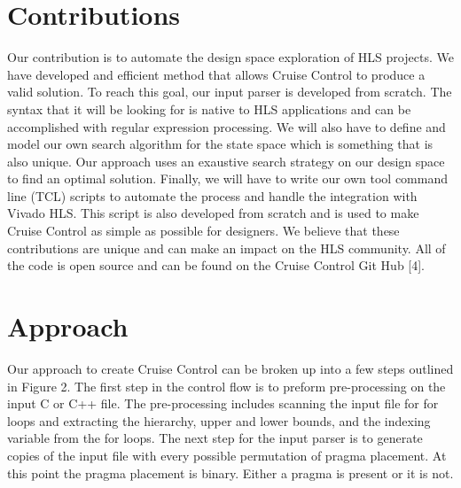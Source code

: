 \documentclass[letterpaper, 10 pt, conference]{IEEEconf}  %
\begin{document}
\section{Contributions}
Our contribution is to automate the design space exploration of HLS projects. We have developed and efficient method that allows Cruise Control to produce a valid solution. To reach this goal, our input parser is developed from scratch. The syntax that it will be looking for is native to HLS applications and can be accomplished  with regular expression processing. We will also have to define and model our own search algorithm for the state space which is something that is also unique. Our approach uses an exaustive search strategy on our design space to find an optimal solution.  Finally, we will have to write our own tool command line (TCL) scripts to automate the process and handle the integration with Vivado HLS. This script is also developed from scratch and is used to make Cruise Control as simple as possible for designers. We believe that these contributions are unique and can make an impact on the HLS community. All of the code is open source and can be found on the Cruise Control Git Hub [4]. 


\section{Approach}
Our approach to create Cruise Control can be broken up into a few steps outlined in Figure 2. The first step in the control flow is to preform pre-processing on the input C or C++ file.  The pre-processing includes scanning the input file for for loops and extracting the hierarchy, upper and lower bounds, and the indexing variable from the for loops. The next step for the input parser is to generate copies of the input file with every possible permutation of pragma placement. At this point the pragma placement is binary. Either a pragma is present or it is not. \newline
\end{document}
